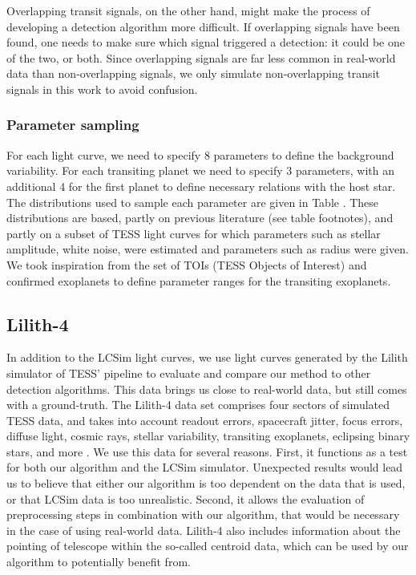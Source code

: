 Overlapping transit signals, on the other hand, might make the process of developing a detection algorithm more difficult. If overlapping signals have been found, one needs to make sure which signal triggered a detection: it could be one of the two, or both. Since overlapping signals are far less common in real-world data than non-overlapping signals, we only simulate non-overlapping transit signals in this work to avoid confusion.

\subsubsection{Parameter sampling}
For each light curve, we need to specify 8 parameters to define the background variability. For each transiting planet we need to specify 3 parameters, with an additional 4 for the first planet to define necessary relations with the host star. The distributions used to sample each parameter are given in Table . These distributions are based, partly on previous literature (see table footnotes), and partly on a subset of TESS light curves for which parameters such as stellar amplitude, white noise, were estimated and parameters such as radius were given. We took inspiration from the set of TOIs (TESS Objects of Interest) and confirmed exoplanets to define parameter ranges for the transiting exoplanets.

\subsection{Lilith-4}
In addition to the LCSim light curves, we use light curves generated by the Lilith simulator of TESS' pipeline to evaluate and compare our method to other detection algorithms. This data brings us close to real-world data, but still comes with a ground-truth. The Lilith-4 data set comprises four sectors of simulated TESS data, and takes into account readout errors, spacecraft jitter, focus errors, diffuse light, cosmic rays, stellar variability, transiting exoplanets, eclipsing binary stars, and more \citep{osborn2020rapid}. We use this data for several reasons. First, it functions as a test for both our algorithm and the LCSim simulator. Unexpected results would lead us to believe that either our algorithm is too dependent on the data that is used, or that LCSim data is too unrealistic. Second, it allows the evaluation of preprocessing steps in combination with our algorithm, that would be necessary in the case of using real-world data. Lilith-4 also includes information about the pointing of telescope within the so-called centroid data, which can be used by our algorithm to potentially benefit from.